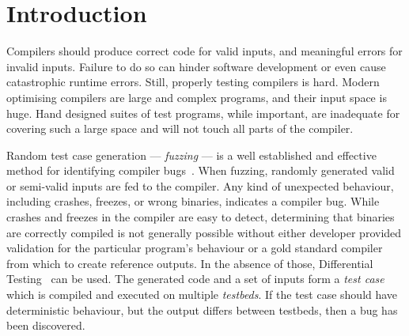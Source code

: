 \section{Introduction}

%

Compilers should produce correct code for valid inputs, and meaningful errors for invalid inputs. Failure to do so can hinder software development or even cause catastrophic runtime errors. Still, properly testing compilers is hard. Modern optimising compilers are large and complex programs, and their input space is huge. Hand designed suites of test programs, while important, are inadequate for covering such a large space and will not touch all parts of the compiler.

Random test case generation --- \emph{fuzzing} --- is a well established and effective method for identifying compiler bugs~\cite{Chen2014a,Chen2013,Kossatchev2005}. When fuzzing, randomly generated valid or semi-valid inputs are fed to the compiler. Any kind of unexpected behaviour, including crashes, freezes, or wrong binaries, indicates a compiler bug. While crashes and freezes in the compiler are easy to detect, determining that binaries are correctly compiled is not generally possible without either developer provided validation for the particular program's behaviour or a gold standard compiler from which to create reference outputs. In the absence of those, Differential Testing~\cite{McKeeman1998} can be used. The generated code and a set of inputs form a \emph{test case} which is compiled and executed on multiple \emph{testbeds}. If the test case should have deterministic behaviour, but the output differs between testbeds, then a bug has been discovered.

